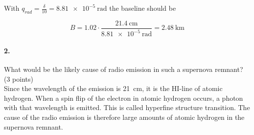 \documentclass[11pt,a4paper,twoside]{article}
\begin{document}
With $ q_{rad} = \frac{\delta}{10} = \SI{8.81e-5}{\radian}$ the baseline should be

\begin{equation}
 B = 1.02 \cdot \frac{\SI{21.4}{\cm}}{\SI{8.81e-5}{\radian}} = \SI{2.48}{\kilo\metre}
\end{equation}


\paragraph{2.} What would be the likely cause of radio emission in such a
supernova remnant? (3 points) \\

Since the wavelength of the emission is \SI{21}{\cm}, it is the HI-line of atomic hydrogen. When a spin flip of the electron in atomic hydrogen occurs, a photon with that wavelength is emitted. This is called hyperfine structure transition. The cause of the radio emission is therefore large amounts of atomic hydrogen in the supernova remnant. 
\end{document}
